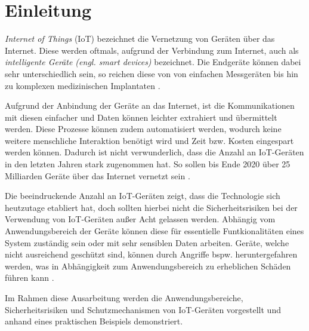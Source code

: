 \section{Einleitung}
\textit{Internet of Things} (IoT) bezeichnet die Vernetzung von Geräten
über das Internet.  Diese werden oftmals, aufgrund der Verbindung zum Internet,
auch als \textit{intelligente Geräte (engl. smart devices)} bezeichnet. Die
Endgeräte können dabei sehr unterschiedlich sein, so reichen diese von von
einfachen Messgeräten bis hin zu komplexen medizinischen Implantaten
\cite{paper}.

Aufgrund der Anbindung der Geräte an das Internet, ist die Kommunikationen mit
diesen einfacher und Daten können leichter extrahiert und übermittelt werden.
Diese Prozesse können zudem automatisiert werden, wodurch keine weitere
menschliche Interaktion benötigt wird und Zeit bzw. Kosten eingespart werden
können. Dadurch ist nicht verwunderlich, dass die Anzahl an IoT-Geräten in den
letzten Jahren stark zugenommen hat. So sollen bis Ende 2020 über 25 Milliarden
Geräte über das Internet vernetzt sein \cite{paper}.

Die beeindruckende Anzahl an IoT-Geräten zeigt, dass die Technologie sich
heutzutage etabliert hat, doch sollten hierbei nicht die Sicherheitsrisiken bei
der Verwendung von IoT-Geräten außer Acht gelassen werden. Abhängig vom
Anwendungsbereich der Geräte können diese für essentielle Funtkionalitäten eines
System zuständig sein oder mit sehr sensiblen Daten arbeiten.  Geräte, welche
nicht ausreichend geschützt sind, können durch Angriffe bspw.  heruntergefahren
werden, was in Abhängigkeit zum Anwendungsbereich zu erheblichen Schäden führen
kann \cite{paper}.

Im Rahmen diese Ausarbeitung werden die Anwendungsbereiche, Sicherheitsrisiken
und Schutzmechanismen von IoT-Geräten vorgestellt und anhand eines praktischen
Beispiels demonstriert.
